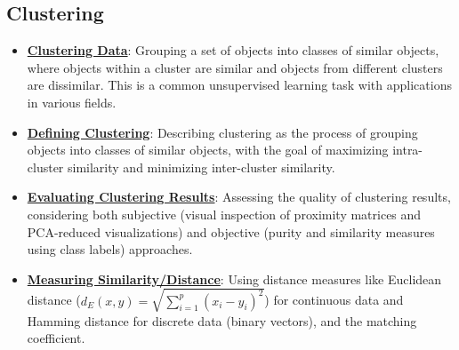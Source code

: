 \documentclass{article}%
\begin{document}
\subsection{Clustering}%
\label{subsec:Clustering}%
\begin{itemize}[leftmargin=*]%
\item \href{https://purdue.brightspace.com/d2l/common/assets/pdfjs-d2l-dist/1.0.14-legacy/web/viewer.html?file=\%2Fcontent\%2Fenforced\%2F1095467-wl.202510.CS.24300.001\%2F12L2-distance-clusters.pdf\%3Fou\%3D1095467\&lang=en-us\&container=d2l-fileviewer-rendered-pdf\&fullscreen=d2l-fileviewer-rendered-pdf-dialog\&height=667#page=4}{\textbf{Clustering Data}}: Grouping a set of objects into classes of similar objects, where objects within a cluster are similar and objects from different clusters are dissimilar. This is a common unsupervised learning task with applications in various fields.%
\item \href{https://purdue.brightspace.com/d2l/common/assets/pdfjs-d2l-dist/1.0.14-legacy/web/viewer.html?file=\%2Fcontent\%2Fenforced\%2F1095467-wl.202510.CS.24300.001\%2F12L2-distance-clusters.pdf\%3Fou\%3D1095467\&lang=en-us\&container=d2l-fileviewer-rendered-pdf\&fullscreen=d2l-fileviewer-rendered-pdf-dialog\&height=667#page=4}{\textbf{Defining Clustering}}: Describing clustering as the process of grouping objects into classes of similar objects, with the goal of maximizing intra-cluster similarity and minimizing inter-cluster similarity.%
\item \href{https://purdue.brightspace.com/d2l/common/assets/pdfjs-d2l-dist/1.0.14-legacy/web/viewer.html?file=\%2Fcontent\%2Fenforced\%2F1095467-wl.202510.CS.24300.001\%2F12L2-distance-clusters.pdf\%3Fou\%3D1095467\&lang=en-us\&container=d2l-fileviewer-rendered-pdf\&fullscreen=d2l-fileviewer-rendered-pdf-dialog\&height=667#page=32}{\textbf{Evaluating Clustering Results}}: Assessing the quality of clustering results, considering both subjective (visual inspection of proximity matrices and PCA-reduced visualizations) and objective (purity and similarity measures using class labels) approaches.%
\item \href{https://purdue.brightspace.com/d2l/common/assets/pdfjs-d2l-dist/1.0.14-legacy/web/viewer.html?file=\%2Fcontent\%2Fenforced\%2F1095467-wl.202510.CS.24300.001\%2F12L2-distance-clusters.pdf\%3Fou\%3D1095467\&lang=en-us\&container=d2l-fileviewer-rendered-pdf\&fullscreen=d2l-fileviewer-rendered-pdf-dialog\&height=667#page=17}{\textbf{Measuring Similarity/Distance}}: Using distance measures like Euclidean distance ($d_E(x, y) = \sqrt{\sum_{i=1}^p (x_i - y_i)^2}$) for continuous data and Hamming distance for discrete data (binary vectors), and the matching coefficient.%

\end{itemize}
\end{document}
